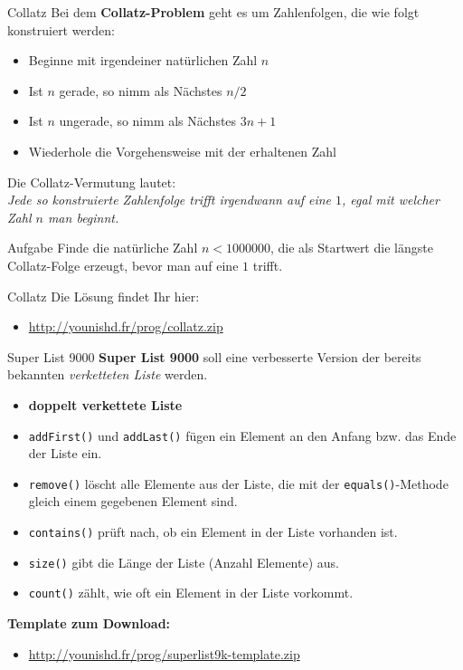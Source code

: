 \documentclass[18pt]{beamer}
\begin{document}
\begin{frame}{Collatz}
    Bei dem \textbf{Collatz-Problem} geht es um Zahlenfolgen, die wie folgt konstruiert werden:
    \begin{itemize}
        \item Beginne mit irgendeiner natürlichen Zahl $n$
        \item Ist $n$ gerade, so nimm als Nächstes $n / 2$
        \item Ist $n$ ungerade, so nimm als Nächstes $3n + 1$
        \item Wiederhole die Vorgehensweise mit der erhaltenen Zahl
    \end{itemize}

    Die Collatz-Vermutung lautet:\\

    \textit{Jede so konstruierte Zahlenfolge trifft irgendwann auf eine $1$, egal mit welcher Zahl $n$ man beginnt.}

    \begin{exampleblock}{Aufgabe}
        Finde die natürliche Zahl $n < 1000000$, die als Startwert die längste Collatz-Folge erzeugt,
        bevor man auf eine $1$ trifft.
    \end{exampleblock}
\end{frame}

\begin{frame}{Collatz}
    Die Lösung findet Ihr hier:
    \begin{itemize}
        \item \url{http://younishd.fr/prog/collatz.zip}
    \end{itemize}
\end{frame}

\begin{frame}{Super List 9000}
    \textbf{Super List 9000} soll eine verbesserte Version der bereits bekannten \textit{verketteten Liste} werden.

    \begin{itemize}
        \item \textbf{doppelt verkettete Liste}
        \item \texttt{addFirst()} und \texttt{addLast()} fügen ein Element an den Anfang bzw. das Ende der Liste ein.
        \item \texttt{remove()} löscht alle Elemente aus der Liste, die mit der \texttt{equals()}-Methode gleich einem gegebenen Element sind.
        \item \texttt{contains()} prüft nach, ob ein Element in der Liste vorhanden ist.
        \item \texttt{size()} gibt die Länge der Liste (Anzahl Elemente) aus.
        \item \texttt{count()} zählt, wie oft ein Element in der Liste vorkommt.
    \end{itemize}

    \textbf{Template zum Download:}\\
    \begin{itemize}
        \item \url{http://younishd.fr/prog/superlist9k-template.zip}
    \end{itemize}

\end{frame}
\end{document}
